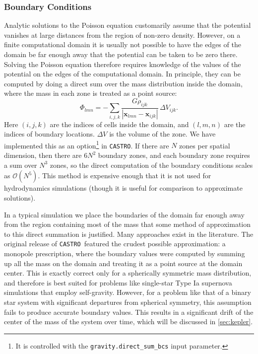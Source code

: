 \documentclass[iop]{../emulateapj}
\newcommand{\castro}{\texttt{CASTRO}}
\begin{document}
\subsubsection{Boundary Conditions}\label{sec:gravity_boundary_conditions}

Analytic solutions to the Poisson equation customarily assume that the
potential vanishes at large distances from the region of non-zero
density. However, on a finite computational domain it is usually not
possible to have the edges of the domain be far enough away that the
potential can be taken to be zero there. Solving the Poisson equation
therefore requires knowledge of the values of the potential on the
edges of the computational domain. In principle, they can be computed
by doing a direct sum over the mass distribution inside the domain,
where the mass in each zone is treated as a point source:
\begin{equation}
  \Phi_{{lmn}} = -\sum_{{i, j, k}} \frac{G \rho_{{ijk}}}{|\mathbf{x}_{{lmn}} - \mathbf{x}_{{ijk}}|}\, \Delta V_{{ijk}}.\label{eq:direct_sum}
\end{equation}
Here $(i, j, k)$ are the indices of cells inside the domain, and $(l,m, n)$ 
are the indices of boundary locations. $\Delta V$ is the volume of the
zone. We have implemented this as an option\footnote{It is controlled
  with the \texttt{gravity.direct\_sum\_bcs} input parameter.} in
\castro. If there are $N$ zones per spatial dimension, then there are
$6 N^2$ boundary zones, and each boundary zone requires a sum over
$N^3$ zones, so the direct computation of the boundary conditions
scales as $\mathcal{O}(N^5)$.  This method is expensive enough that it is not used
for hydrodynamics simulations (though it is useful for comparison to
approximate solutions).

In a typical simulation we place the boundaries of the domain far
enough away from the region containing most of the mass that some
method of approximation to this direct summation is justified. Many
approaches exist in the literature. The original release of \castro\
featured the crudest possible approximation: a monopole prescription,
where the boundary values were computed by summing up all the mass on
the domain and treating it as a point source at the domain
center. This is exactly correct only for a spherically symmetric mass
distribution, and therefore is best suited for problems like
single-star Type Ia supernova simulations that employ
self-gravity. However, for a problem like that of a binary star system
with significant departures from spherical symmetry, this assumption
fails to produce accurate boundary values. This results in a
significant drift of the center of the mass of the system over time,
which will be discussed in \autoref{sec:kepler}.
\end{document}
